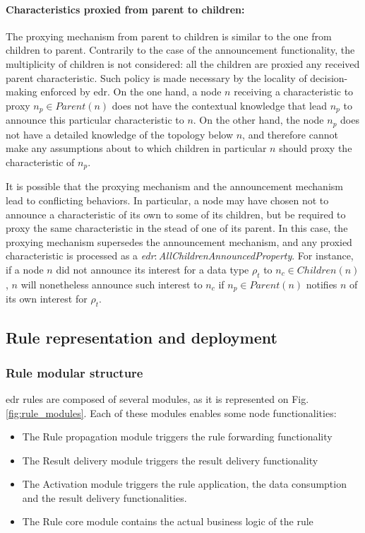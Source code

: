 \documentclass{iosart2c}
\newcommand{\namespace}[1]{\textit{#1$:$}}
\newcommand{\concept}[2]{\namespace{#1}\-\textit{#2}}
\begin{document}
\paragraph{Characteristics proxied from parent to children:}
The proxying mechanism from parent to children is similar to the one from children to parent.
Contrarily to the case of the announcement functionality, the multiplicity of children is not considered: all the children are proxied any received parent characteristic.
Such policy is made necessary by the locality of decision-making enforced by \gls{edr}. 
On the one hand, a node $n$ receiving a characteristic to proxy $n_{p}\in Parent(n)$ does not have the contextual knowledge that lead $n_{p}$ to announce this particular characteristic to $n$.
On the other hand, the node $n_{p}$ does not have a detailed knowledge of the topology below $n$, and therefore cannot make any assumptions about to which children in particular $n$ should proxy the characteristic of $n_{p}$.

It is possible that the proxying mechanism and the announcement mechanism lead to conflicting behaviors.
In particular, a node may have chosen not to announce a characteristic of its own to some of its children, but be required to proxy the same characteristic in the stead of one of its parent.
In this case, the proxying mechanism supersedes the announcement mechanism, and any proxied characteristic is processed as a \concept{edr}{All\-Children\-Announced\-Property}.
For instance, if a node $n$ did not announce its interest for a data type $\rho_t$ to $n_{c}\in Children(n)$, $n$ will nonetheless announce such interest to $n_{c}$ if $n_{p}\in Parent(n)$ notifies $n$ of its own interest for $\rho_t$.

\subsection{Rule representation and deployment}
\label{subs:edr_rules}

\subsubsection{Rule modular structure}

\gls{edr} rules are composed of several modules, as it is represented on Fig. \ref{fig:rule_modules}. 
Each of these modules enables some node functionalities:

\begin{itemize}
	\item The Rule propagation module triggers the rule forwarding functionality
	\item The Result delivery module triggers the result delivery functionality
	\item The Activation module triggers the rule application, the data consumption and the result delivery functionalities.
	\item The Rule core module contains the actual business logic of the rule
\end{itemize}
\end{document}
